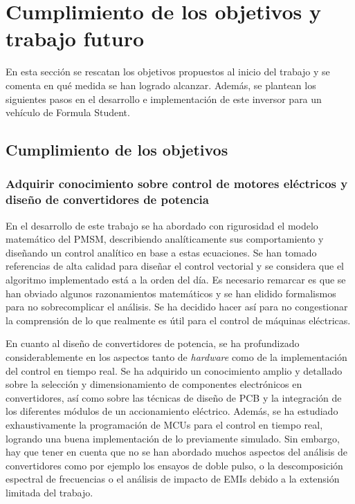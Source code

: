 \newpage
\section{Cumplimiento de los objetivos y trabajo futuro}

En esta sección se rescatan los objetivos propuestos al inicio del trabajo y se comenta en qué medida se han logrado alcanzar. Además, se plantean los siguientes pasos en el desarrollo e implementación de este inversor para un vehículo de Formula Student.

\subsection{Cumplimiento de los objetivos}

\subsubsection{Adquirir conocimiento sobre control de motores eléctricos y diseño de convertidores de potencia} 

En el desarrollo de este trabajo se ha abordado con rigurosidad el modelo matemático del PMSM, describiendo analíticamente sus comportamiento y diseñando un control analítico en base a estas ecuaciones. Se han tomado referencias de alta calidad para diseñar el control vectorial y se considera que el algoritmo implementado está a la orden del día. Es necesario remarcar es que se han obviado algunos razonamientos matemáticos y se han elidido formalismos para no sobrecomplicar el análisis. Se ha decidido hacer así para no congestionar la comprensión de lo que realmente es útil para el control de máquinas eléctricas.

En cuanto al diseño de convertidores de potencia, se ha profundizado considerablemente en los aspectos tanto de \textit{hardware} como de la implementación del control en tiempo real. Se ha adquirido un conocimiento amplio y detallado sobre la selección y dimensionamiento de componentes electrónicos en convertidores, así como sobre las técnicas de diseño de PCB y la integración de los diferentes módulos de un accionamiento eléctrico. Además, se ha estudiado exhaustivamente la programación de MCUs para el control en tiempo real, logrando una buena implementación de lo previamente simulado. Sin embargo, hay que tener en cuenta que no se han abordado muchos aspectos del análisis de convertidores como por ejemplo los ensayos de doble pulso, o la descomposición espectral de frecuencias o el análisis de impacto de EMIs debido a la extensión limitada del trabajo.

